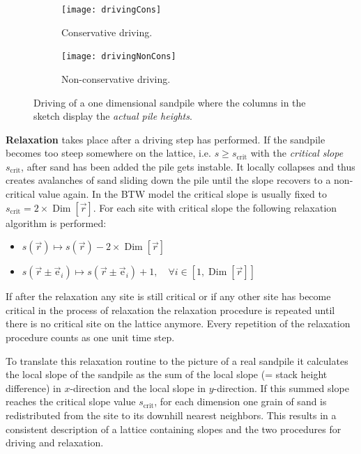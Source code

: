 \begin{figure}[htb]
    \centering
    \begin{subfigure}{0.48\linewidth}
        \texttt{[image: drivingCons]}
        \caption{Conservative driving.}
        \label{fig:driving:cons}
    \end{subfigure}
    \begin{subfigure}{0.48\linewidth}
        \texttt{[image: drivingNonCons]}
        \caption{Non-conservative driving.}
        \label{fig:driving:non-cons}
    \end{subfigure}
    \caption{Driving of a one dimensional sandpile where the columns in the sketch display
             the \emph{actual pile heights}.}
    \label{fig:driving}
\end{figure}

\textbf{Relaxation} takes place after a driving step has performed. If the sandpile becomes too steep somewhere on the
lattice, i.e. $s \geq s_{\mathrm{crit}}$ with the \emph{critical slope} $s_{\mathrm{crit}}$, after sand has been added
the pile gets instable. It locally collapses and thus creates avalanches of sand sliding down the pile until the slope
recovers to a non-critical value again. In the BTW model the critical slope is usually fixed to
$s_{\mathrm{crit}}=2\times\operatorname{Dim}\left[\vec{r}\right]$. For each site with critical slope the following
relaxation algorithm is performed:
\begin{itemize}
\item $s(\vec{r}) \mapsto s(\vec{r}) - 2\times\operatorname{Dim}\left[\vec{r}\right]$
\item $s(\vec{r}\pm\vec{\mathrm{e}}_i) \mapsto s(\vec{r}\pm\vec{\mathrm{e}}_i) + 1,
\quad \forall i\in[1,\operatorname{Dim}\left[\vec{r}\right]]$
\end{itemize}
If after the relaxation any site is still critical or if any other site has become critical in the process of
relaxation the relaxation procedure is repeated until there is no critical site on the lattice anymore.
Every repetition of the relaxation procedure counts as one unit time step.

To translate this relaxation routine to the picture of a real sandpile it calculates the local slope of the sandpile as
the sum of the local slope (= stack height difference) in $x$-direction and the local slope in $y$-direction.
If this summed slope reaches the critical slope value $s_{\mathrm{crit}}$, for each dimension one grain of sand is
redistributed from the site to its downhill nearest neighbors. This results in a consistent description of a lattice
containing slopes and the two procedures for driving and relaxation.

